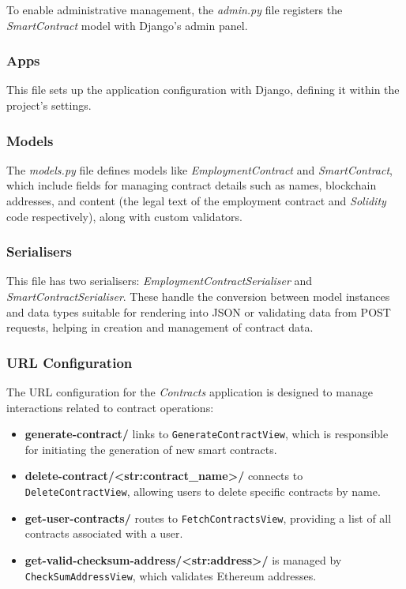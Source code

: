 To enable administrative management, the \textit{admin.py} file registers the \textit{SmartContract} model with Django's admin panel.

\subsubsection{Apps} 

This file sets up the application configuration with Django, defining it within the project's settings.

\subsubsection{Models} 

The \textit{models.py} file defines models like \textit{EmploymentContract} and \textit{SmartContract}, which include fields for managing contract details such as names, blockchain addresses, and content (the legal text of the employment contract and \textit{Solidity} code respectively), along with custom validators.

\subsubsection{Serialisers}

This file has two serialisers: \textit{EmploymentContractSerialiser} and \textit{SmartContractSerialiser}. These handle the conversion between model instances and data types suitable for rendering into JSON or validating data from POST requests, helping in creation and management of contract data.

\subsubsection{URL Configuration}

The URL configuration for the \textit{Contracts} application is designed to manage interactions related to contract operations:

\begin{itemize}
    \item \textbf{generate-contract/} links to \texttt{GenerateContractView}, which is responsible for initiating the generation of new smart contracts.
    \item \textbf{delete-contract/<str:contract\_name>/} connects to \texttt{DeleteContractView}, allowing users to delete specific contracts by name.
    \item \textbf{get-user-contracts/} routes to \texttt{FetchContractsView}, providing a list of all contracts associated with a user.
    \item \textbf{get-valid-checksum-address/<str:address>/} is managed by \texttt{CheckSumAddressView}, which validates Ethereum addresses.
\end{itemize}

